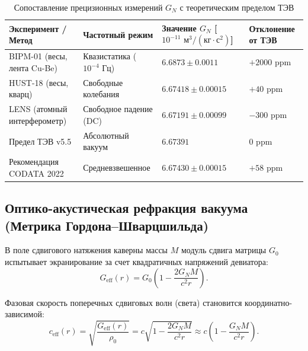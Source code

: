 \documentclass[11pt,a4paper]{article}
\theoremstyle{definition}
\theoremstyle{remark}
\begin{document}
\begin{table}[htbp]
\centering
\small
\setlength{\tabcolsep}{3.5pt}
\renewcommand{\arraystretch}{1.25}
\caption{Сопоставление прецизионных измерений $G_N$ с теоретическим пределом ТЭВ}
\label{tab:gravimetry_dispersion_audit}
	\vspace{2mm}
\begin{tabularx}{\textwidth}{
>{\raggedright\arraybackslash}p{4.6cm}
>{\centering\arraybackslash}p{3.2cm}
>{\centering\arraybackslash}X
>{\centering\arraybackslash}p{2.3cm}
}
\toprule
Эксперимент / Метод & Частотный режим & Значение $G_N$ [$10^{-11}\text{ м}^3/(\text{кг}\cdot\text{с}^2)$] & Отклонение от ТЭВ \\
\midrule
BIPM-01 (весы, лента Cu-Be) & Квазистатика ($10^{-4}\text{ Гц}$) & $6.6873 \pm 0.0011$ & $+2000\text{ ppm}$ \\
HUST-18 (весы, кварц) & Свободные колебания & $6.67418 \pm 0.00015$ & $+40\text{ ppm}$ \\
LENS (атомный интерферометр) & Свободное падение (DC) & $6.67191 \pm 0.00099$ & $-300\text{ ppm}$ \\
\midrule
Предел ТЭВ v5.5 & Абсолютный вакуум & $6.67391$ & $0\text{ ppm}$ \\
Рекомендация CODATA 2022 & Средневзвешенное & $6.67430 \pm 0.00015$ & $+58\text{ ppm}$ \\
\bottomrule
\end{tabularx}
\end{table}

\subsection{Оптико-акустическая рефракция вакуума\\ (Метрика Гордона--Шварцшильда)}

В поле сдвигового натяжения каверны массы $M$ модуль сдвига матрицы $G_0$ испытывает экранирование за счет квадратичных напряжений девиатора:
\begin{equation}
G_{\mathrm{eff}}(r) = G_0 \left( 1 - \frac{2 G_N M}{c^2 r} \right).
\label{eq:G_eff_shear_screening}
\end{equation}

Фазовая скорость поперечных сдвиговых волн (света) становится координатно-зависимой:
\begin{equation}
	c_{\mathrm{eff}}(r) = \sqrt{\frac{G_{\mathrm{eff}}(r)}{\rho_0}} = c \sqrt{1 - \frac{2 G_N M}{c^2 r}} \approx c \left( 1 - \frac{G_N M}{c^2 r} \right).
	\label{eq:variable_light_speed}
\end{equation}
\end{document}
